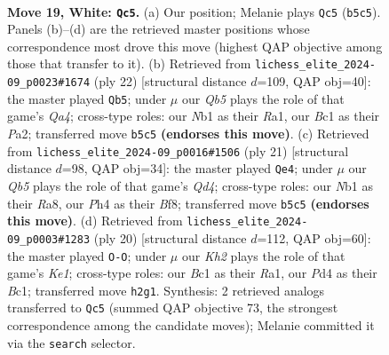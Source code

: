 \documentclass[11pt]{article}
\begin{document}
\clearpage

\begin{figure}[p]\centering
\begin{subfigure}{0.46\textwidth}\centering
\resizebox{\linewidth}{!}{%
\newchessgame
\chessboard[
  setfen={rnb1r1k1/pp2qpb1/4pnp1/1Q1p3p/P2P3P/1B3NP1/RPP2P1K/1NB1R3 w - - 1 19},
  showmover=false,
  pgfstyle=straightmove, color=movearrow, markmove={b5-c5}
]}
\caption{}
\end{subfigure}\hfill
\begin{subfigure}{0.46\textwidth}\centering
\resizebox{\linewidth}{!}{%
\newchessgame
\chessboard[
  setfen={rn1r2k1/pb1pbppp/1q2pn2/2p5/Q1P2B2/2N2NP1/PP2PPBP/R2R2K1 w - - 8 12},
  showmover=false,
  pgfstyle=straightmove, color=movearrow, markmove={a4-b5}
]}
\caption{}
\end{subfigure}
\\[4pt]
\begin{subfigure}{0.46\textwidth}\centering
\resizebox{\linewidth}{!}{%
\newchessgame
\chessboard[
  setfen={r3kb1r/pp3ppp/2p1pn2/3q4/3P2b1/2P2NP1/PP2QPBP/R1B1K2R b KQkq - 2 11},
  showmover=false,
  pgfstyle=straightmove, color=movearrow, markmove={d5-e4}
]}
\caption{}
\end{subfigure}\hfill
\begin{subfigure}{0.46\textwidth}\centering
\resizebox{\linewidth}{!}{%
\newchessgame
\chessboard[
  setfen={r1bqk2r/1p2ppbp/2p2np1/p1n5/P6Q/2N2N2/BPPP2PP/R1B1K2R w KQkq - 1 11},
  showmover=false,
  pgfstyle=straightmove, color=movearrow, markmove={e1-g1}
]}
\caption{}
\end{subfigure}
\caption{\textbf{Move 19, White: \texttt{Qc5}.} (a) Our position; Melanie plays \texttt{Qc5} (\texttt{b5c5}). Panels (b)--(d) are the retrieved master positions whose correspondence most drove this move (highest QAP objective among those that transfer to it). (b) Retrieved from \texttt{lichess\_elite\_2024-09\_p0023\#1674} (ply 22) [structural distance $d$=109, QAP obj=40]: the master played \texttt{Qb5}; under $\mu$ our \emph{Qb5} plays the role of that game's \emph{Qa4}; cross-type roles: our \emph{N}b1 as their \emph{R}a1, our \emph{B}c1 as their \emph{P}a2; transferred move \texttt{b5c5} \textbf{(endorses this move)}. (c) Retrieved from \texttt{lichess\_elite\_2024-09\_p0016\#1506} (ply 21) [structural distance $d$=98, QAP obj=34]: the master played \texttt{Qe4}; under $\mu$ our \emph{Qb5} plays the role of that game's \emph{Qd4}; cross-type roles: our \emph{N}b1 as their \emph{R}a8, our \emph{P}h4 as their \emph{B}f8; transferred move \texttt{b5c5} \textbf{(endorses this move)}. (d) Retrieved from \texttt{lichess\_elite\_2024-09\_p0003\#1283} (ply 20) [structural distance $d$=112, QAP obj=60]: the master played \texttt{O-O}; under $\mu$ our \emph{Kh2} plays the role of that game's \emph{Ke1}; cross-type roles: our \emph{B}c1 as their \emph{R}a1, our \emph{P}d4 as their \emph{B}c1; transferred move \texttt{h2g1}. Synthesis: 2 retrieved analogs transferred to \texttt{Qc5} (summed QAP objective 73, the strongest correspondence among the candidate moves); Melanie committed it via the \texttt{search} selector.}
\label{fig:thought-m36}
\end{figure}
\end{document}
